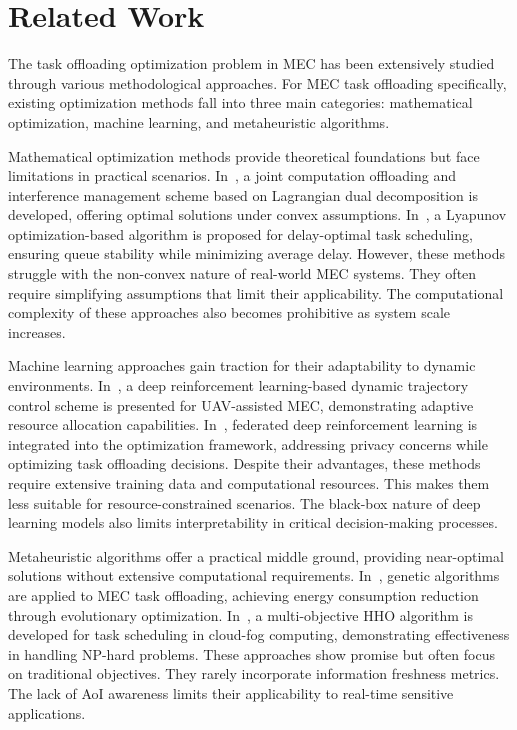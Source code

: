 \documentclass[conference]{IEEEtran}
\begin{document}
\section{Related Work}

The task offloading optimization problem in MEC has been extensively studied through various methodological approaches. For MEC task offloading specifically, existing optimization methods fall into three main categories: mathematical optimization, machine learning, and metaheuristic algorithms. 

Mathematical optimization methods provide theoretical foundations but face limitations in practical scenarios. In~\cite{wang2017joint}, a joint computation offloading and interference management scheme based on Lagrangian dual decomposition is developed, offering optimal solutions under convex assumptions. In~\cite{liu2016delay}, a Lyapunov optimization-based algorithm is proposed for delay-optimal task scheduling, ensuring queue stability while minimizing average delay. However, these methods struggle with the non-convex nature of real-world MEC systems. They often require simplifying assumptions that limit their applicability. The computational complexity of these approaches also becomes prohibitive as system scale increases.

Machine learning approaches gain traction for their adaptability to dynamic environments. In~\cite{wang2021deep}, a deep reinforcement learning-based dynamic trajectory control scheme is presented for UAV-assisted MEC, demonstrating adaptive resource allocation capabilities. In~\cite{zang2022federated}, federated deep reinforcement learning is integrated into the optimization framework, addressing privacy concerns while optimizing task offloading decisions. Despite their advantages, these methods require extensive training data and computational resources. This makes them less suitable for resource-constrained scenarios. The black-box nature of deep learning models also limits interpretability in critical decision-making processes.

Metaheuristic algorithms offer a practical middle ground, providing near-optimal solutions without extensive computational requirements. In~\cite{li2020genetic}, genetic algorithms are applied to MEC task offloading, achieving energy consumption reduction through evolutionary optimization. In~\cite{ali2024multiobjective}, a multi-objective HHO algorithm is developed for task scheduling in cloud-fog computing, demonstrating effectiveness in handling NP-hard problems. These approaches show promise but often focus on traditional objectives. They rarely incorporate information freshness metrics. The lack of AoI awareness limits their applicability to real-time sensitive applications.
\end{document}
